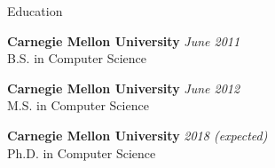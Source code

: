 \documentclass{resume} %
\begin{document}

\begin{rSection}{Education}

{\bf Carnegie Mellon University} \hfill {\em June 2011} \\ 
B.S. in Computer Science

{\bf Carnegie Mellon University} \hfill {\em June 2012} \\ 
M.S. in Computer Science

{\bf Carnegie Mellon University} \hfill {\em 2018 (expected)} \\ 
Ph.D. in Computer Science


\end{rSection}

\end{document}
